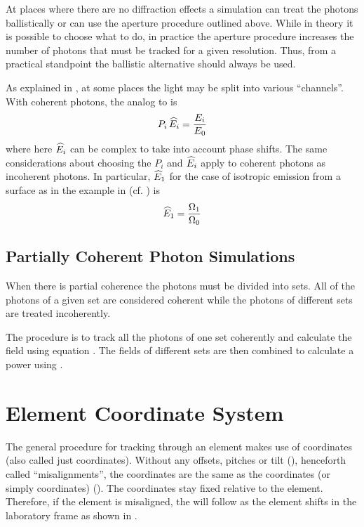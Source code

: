 At places where there are no diffraction effects a simulation can
treat the photons ballistically or can use the aperture procedure
outlined above. While in theory it is possible to choose what to do, in
practice the aperture procedure increases the number of photons that
must be tracked for a given resolution. Thus, from a practical standpoint
the ballistic alternative should always be used.

As explained in , at some places the light may be split
into various ``channels''. With coherent photons, the analog to  is
\begin{equation}
  P_i \, \widehat E_i = \frac{E_i}{E_0}
  \label{rpss2}
\end{equation}
where here $\widehat E_i$ can be complex to take into account phase shifts.
The same considerations about choosing the $P_i$ and $\widehat E_i$ apply to
coherent photons as incoherent photons. In particular, $\widehat E_1$ for the
case of isotropic emission from a surface as in the example in
 (cf. ) is
\begin{equation}
  \widehat E_1 = \frac{\Omega_1}{\Omega_0}
\end{equation}

\subsection{Partially Coherent Photon Simulations}

When there is partial coherence the photons must be divided into
sets. All of the photons of a given set are considered coherent while
the photons of different sets are treated incoherently.

The procedure is to track all the photons of one set coherently and
calculate the field using equation . The fields of
different sets are then combined to calculate a power using
.

\section{Element Coordinate System}
\label{s:photon.ele.coords}

The general procedure for tracking through an element makes use of
 coordinates (also called just 
coordinates). Without any offsets, pitches or tilt (), henceforth
called ``misalignments'', the  coordinates are the same
as the  coordinates (or simply 
coordinates) (). The  coordinates stay fixed
relative to the element. Therefore, if the element is misaligned, the
 will follow as the element shifts in the
laboratory frame as shown in .

